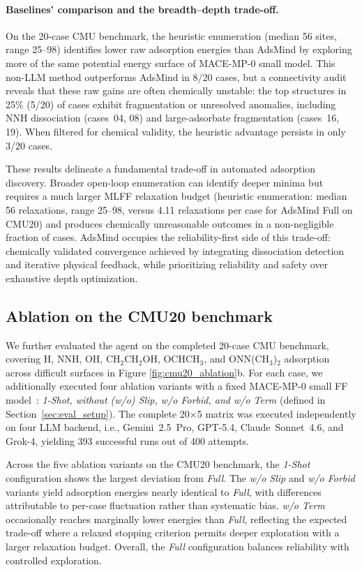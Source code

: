 \paragraph {Baselines' comparison and the breadth--depth trade-off.}
On the 20-case CMU benchmark, the heuristic enumeration (median 56 sites, range 25--98) identifies lower raw adsorption energies than AdsMind by exploring more of the same potential energy surface of MACE-MP-0 small model. This non-LLM method outperforms AdsMind in 8/20 cases, but a connectivity audit reveals that these raw gains are often chemically unstable: the top structures in 25\% (5/20) of cases exhibit fragmentation or unresolved anomalies, including NNH dissociation (cases~04, 08) and large-adsorbate fragmentation (cases~16, 19). When filtered for chemical validity, the heuristic advantage persists in only 3/20 cases.

These results delineate a fundamental trade-off in automated adsorption discovery. Broader open-loop enumeration can identify deeper minima but requires a much larger MLFF relaxation budget (heuristic enumeration: median 56 relaxations, range 25--98, versus 4.11 relaxations per case for AdsMind Full on CMU20) and produces chemically unreasonable outcomes in a non-negligible fraction of cases. AdsMind occupies the reliability-first side of this trade-off: chemically validated convergence achieved by integrating dissociation detection and iterative physical feedback, while prioritizing reliability and safety over exhaustive depth optimization.


\subsection{Ablation on the CMU20 benchmark}

We further evaluated the agent on the completed 20-case CMU benchmark, covering H, NNH, OH, CH$_2$CH$_2$OH, OCHCH$_3$, and ONN(CH$_3$)$_2$ adsorption across difficult surfaces in Figure \ref{fig:cmu20_ablation}b.
For each case, we additionally executed four ablation variants with a fixed MACE-MP-0 small FF model~\cite{batatia2023foundation}: \textit{1-Shot, without (w/o) Slip, w/o Forbid, and w/o Term} (defined in Section~\ref{sec:eval_setup}).
The complete 20$\times$5 matrix was executed independently on four LLM backend, i.e., Gemini~2.5~Pro, GPT-5.4, Claude~Sonnet~4.6, and Grok-4, yielding 393 successful runs out of 400 attempts.


Across the five ablation variants on the CMU20 benchmark, the \textit{1-Shot} configuration shows the largest deviation from \textit{Full}. 
The \textit{w/o Slip} and \textit{w/o Forbid} variants yield adsorption energies nearly identical to \textit{Full}, with differences attributable to per-case fluctuation rather than systematic bias.
\textit{w/o Term} occasionally reaches marginally lower energies than \textit{Full}, reflecting the expected trade-off where a relaxed stopping criterion permits deeper exploration with a larger relaxation budget. Overall, the \textit{Full} configuration balances reliability with controlled exploration.


